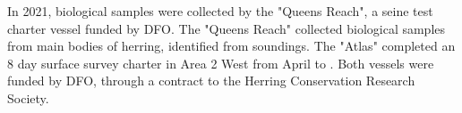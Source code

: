 In 2021, biological samples were collected by the "Queens Reach",
a seine test charter vessel funded by DFO.
The "Queens Reach" collected biological samples from main bodies of herring,
identified from soundings.
The "Atlas" completed an 8 day surface survey charter in Area 2 West from April  to .
Both vessels were funded by DFO, through a contract to the Herring Conservation Research Society.